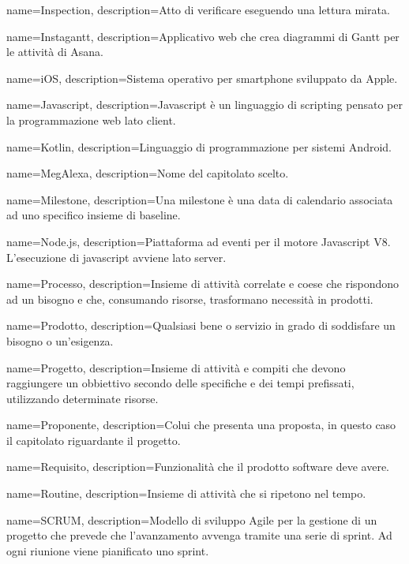 {
name={Inspection},
description={Atto di verificare eseguendo una lettura mirata.}
}

{
name={Instagantt},
description={Applicativo web che crea diagrammi di Gantt per le attività di Asana.}
}

{
name={iOS},
description={Sistema operativo per smartphone sviluppato da Apple.}
}

{
name={Javascript},
description={Javascript è un linguaggio di scripting pensato per la programmazione web lato client.}
}

{
name={Kotlin},
description={Linguaggio di programmazione per sistemi Android.}
}

{
name={MegAlexa},
description={Nome del capitolato scelto.}
}

{
name={Milestone},
description={Una milestone è una data di calendario associata ad uno specifico insieme di baseline.}
}

{
name={Node.js},
description={Piattaforma ad eventi per il motore Javascript V8. L’esecuzione di javascript avviene lato server.}
}

{
name={Processo},
description={Insieme di attività correlate e coese che rispondono ad un bisogno e che, consumando risorse, trasformano necessità in prodotti.}
}

{
name={Prodotto},
description={Qualsiasi bene o servizio in grado di soddisfare un bisogno o un’esigenza.}
}

{
name={Progetto},
description={Insieme di attività e compiti che devono raggiungere un obbiettivo secondo delle specifiche e dei tempi prefissati, utilizzando determinate risorse.}
}

{
name={Proponente},
description={Colui che presenta una proposta, in questo caso il capitolato riguardante il progetto.}
}

{
name={Requisito},
description={Funzionalità che il prodotto software deve avere.}
}

{
name={Routine},
description={Insieme di attività che si ripetono nel tempo.}
}

{
name={SCRUM},
description={Modello di sviluppo Agile per la gestione di un progetto che prevede che l’avanzamento avvenga tramite una serie di sprint. Ad ogni riunione viene pianificato uno sprint.}
}

